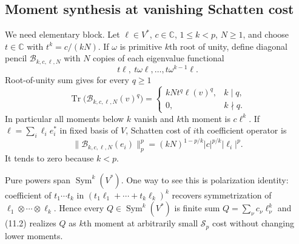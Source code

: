 \documentclass[11pt]{article}
\theoremstyle{definition}
\theoremstyle{remark}
\newcommand{\C}{\mathbb C}
\newcommand{\Tr}{\operatorname{Tr}}
\newcommand{\norm}[1]{\lVert #1\rVert}
\begin{document}
\subsection*{Moment synthesis at vanishing Schatten cost}

We need elementary block.  Let $\ell\in V^*$, $c\in\C$, $1\leq k<p$, $N\geq1$, and choose
$t\in\C$ with $t^k=c/(kN)$.  If $\omega$ is primitive $k$th root of unity, define diagonal
pencil $\mathcal B_{k,c,\ell,N}$ with $N$ copies of each eigenvalue functional
\[
 t\ell,\ t\omega\ell,\ldots,t\omega^{k-1}\ell .
\]
Root-of-unity sum gives for every $q\geq1$
\begin{equation}
 \Tr\bigl(\mathcal B_{k,c,\ell,N}(v)^q\bigr)
 =
 \begin{cases}
  kNt^q\ell(v)^q,&k\mid q,\\
  0,&k\nmid q.
 \end{cases}                                               \tag{11.2}
\end{equation}
In particular all moments below $k$ vanish and $k$th moment is $c\ell^k$.  If
$\ell=\sum_i\ell_i e_i^*$ in fixed basis of $V$, Schatten cost of $i$th coefficient operator is
\begin{equation}
 \norm{\mathcal B_{k,c,\ell,N}(e_i)}_p^p
 =(kN)^{1-p/k}|c|^{p/k}|\ell_i|^p.                        \tag{11.3}
\end{equation}
It tends to zero because $k<p$.

Pure powers span $\operatorname{Sym}^k(V^*)$.  One way to see this is polarization identity:
coefficient of $t_1\cdots t_k$ in
$(t_1\ell_1+\cdots+t_k\ell_k)^k$ recovers symmetrization of
$\ell_1\otimes\cdots\otimes\ell_k$.  Hence every $Q\in\operatorname{Sym}^k(V^*)$ is finite sum
$Q=\sum_\nu c_\nu\ell_\nu^k$ and (11.2) realizes $Q$ as $k$th moment at arbitrarily small
$\mathcal S_p$ cost without changing lower moments.
\end{document}
